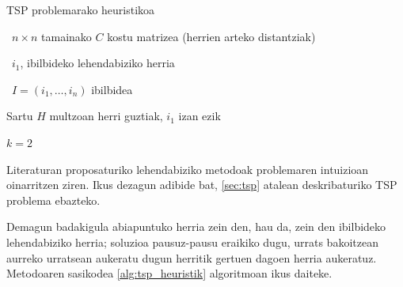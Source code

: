 \documentclass[eu]{ifirak}\usepackage[]{graphicx}\usepackage[]{color}
\begin{document}
\begin{ifalgorithm}[t]
\begin{ifpseudo}{TSP problemarako heuristikoa}
\item \In\ $n \times n$ tamainako $C$ kostu matrizea (herrien arteko distantziak)
\item \In\ $i_1$, ibilbideko lehendabiziko herria
\item \Out\ $I=(i_1, \ldots, i_n)$ ibilbidea
\item Sartu $H$ multzoan herri guztiak, $i_1$ izan ezik
\item $k=2$
\item {}
\item {}
\item {}
\item \Done
\end{ifpseudo}
\caption{TSPrako soluzio onak eraikitzeko metodo heuristikoa}\label{alg:tsp_heuristik}
\end{ifalgorithm}

Literaturan proposaturiko lehendabiziko metodoak problemaren intuizioan oinarritzen ziren. Ikus dezagun adibide bat, \ref{sec:tsp} atalean deskribaturiko TSP problema ebazteko. 

Demagun badakigula abiapuntuko herria zein den, hau da, zein den ibilbideko lehendabiziko herria; soluzioa pausuz-pausu eraikiko dugu, urrats bakoitzean aurreko urratsean aukeratu dugun herritik gertuen dagoen herria aukeratuz. Metodoaren sasikodea \ref{alg:tsp_heuristik} algoritmoan ikus daiteke.
\end{document}
